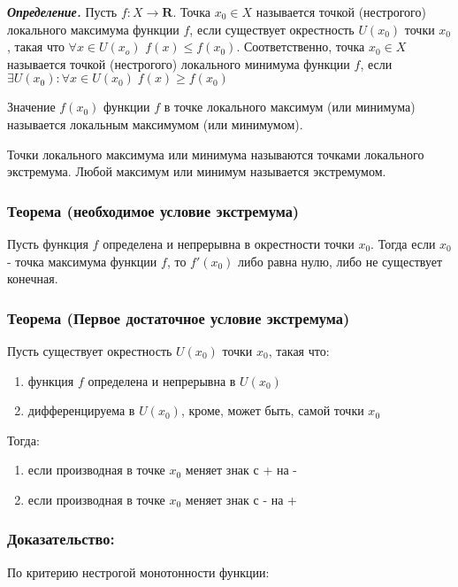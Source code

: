 \documentclass[a4paper,12pt]{article}
\theoremstyle{plain} %
\theoremstyle{definition} %
\theoremstyle{remark} %
\begin{document}
\textit{\textbf{Определение.}} Пусть $f: X \rightarrow \mathbf{R}$. Точка $x_0 \in X$ называется точкой (нестрогого) локального максимума функции $f$, если существует окрестность $U(x_0)$ точки $x_0$, такая что $\forall x \in U(x_o)$ $f(x) \leq f(x_0)$. Соответственно, точка $x_0 \in X$ называется точкой (нестрогого) локального минимума функции $f$, если $\exists U(x_0): \forall x \in U(x_0) \; f(x) \geq f(x_0)$

Значение $f(x_0)$ функции $f$ в точке локального максимум (или минимума) называется локальным максимумом (или минимумом).

Точки локального максимума или минимума называются точками локального экстремума. Любой максимум или минимум называется экстремумом.

\subsubsection*{Теорема (необходимое условие экстремума)}

Пусть функция $f$ определена и непрерывна в окрестности точки $x_0$. Тогда если $x_0$ - точка максимума функции $f$, то $f'(x_0)$ либо равна нулю, либо не существует конечная.

\subsubsection*{Теорема (Первое достаточное условие экстремума)}

Пусть существует окрестность $U(x_0)$ точки $x_0$, такая что:

\begin{enumerate}
	\item функция $f$ определена и непрерывна в $U(x_0)$
	\item дифференцируема в $U(x_0)$, кроме, может быть, самой точки $x_0$
\end{enumerate}
Тогда:
\begin{enumerate}
	\item если производная в точке $x_0$ меняет знак с + на -
	\item если производная в точке $x_0$ меняет знак с - на +
\end{enumerate}

\subsubsection*{Доказательство:}

По критерию нестрогой монотонности функции:
\end{document}
